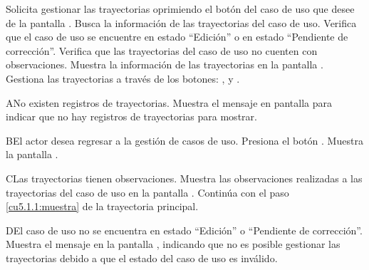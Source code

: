  \begin{UCtrayectoria}
    \UCpaso[\UCactor] Solicita gestionar las trayectorias oprimiendo el botón \btnTray del caso de uso que desee de la pantalla .
    \UCpaso[\UCsist] Busca la información de las trayectorias del caso de uso. 
    \UCpaso[\UCsist] Verifica que el caso de uso se encuentre en estado ``Edición'' o en estado ``Pendiente de corrección''. 
    \UCpaso[\UCsist] Verifica que las trayectorias del caso de uso no cuenten con observaciones. 
    \UCpaso[\UCsist] Muestra la información de las trayectorias en la pantalla . \label{cu5.1.1:muestra}
    \UCpaso[\UCactor] Gestiona las trayectorias a través de los botones: , \btnEditar y \btnEliminar.  \label{cu5.1.1:gestionaCU}
 \end{UCtrayectoria}
 
 \begin{UCtrayectoriaA}{A}{No existen registros de trayectorias.}
    \UCpaso[\UCsist] Muestra el mensaje  en pantalla  
    para indicar que no hay registros de trayectorias para mostrar.
 \end{UCtrayectoriaA}
 
 \begin{UCtrayectoriaA}{B}{El actor desea regresar a la gestión de casos de uso.}
    \UCpaso[\UCactor] Presiona el botón .
    \UCpaso[\UCsist] Muestra la pantalla .
 \end{UCtrayectoriaA}
 
 \begin{UCtrayectoriaA}{C}{Las trayectorias tienen observaciones.}
    \UCpaso[\UCsist] Muestra las observaciones realizadas a las trayectorias del caso de uso en la pantalla .
    \UCpaso[] Continúa con el paso \ref{cu5.1.1:muestra} de la trayectoria principal.
 \end{UCtrayectoriaA}
 
 \begin{UCtrayectoriaA}{D}{El caso de uso no se encuentra en estado ``Edición'' o ``Pendiente de corrección''.}
    \UCpaso[\UCsist] Muestra el mensaje  en la pantalla , indicando que no es posible gestionar las trayectorias debido a que el estado del caso de uso es inválido.
 \end{UCtrayectoriaA}
 
